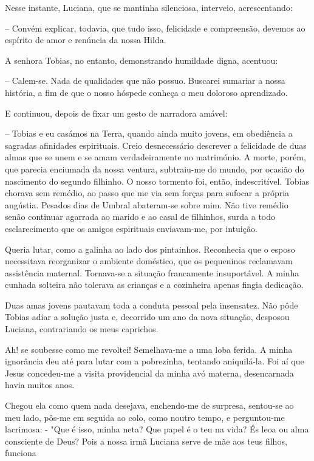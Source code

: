 \documentclass[portuguese,12pt,a4paper]{scrbook}
\begin{document}
	Nesse instante, Luciana, que se mantinha silenciosa, interveio, acrescentando:
	
	– Convém explicar, todavia, que tudo isso, felicidade e compreensão, devemos ao espírito de amor e renúncia da nossa Hilda.
	
	A senhora Tobias, no entanto, demonstrando humildade digna, acentuou:
	
	
	– Calem-se. Nada de qualidades que não possuo. Buscarei sumariar a nossa história, a fim de que o nosso hóspede conheça o meu doloroso aprendizado.
	
	E continuou, depois de fixar um gesto de narradora amável:
	
	– Tobias e eu casámos na Terra, quando ainda muito jovens, em obediência a sagradas afinidades espirituais. Creio desnecessário descrever a felicidade de duas almas que se unem e se amam verdadeiramente no matrimónio. A morte, porém, que parecia enciumada da nossa ventura, subtraiu-me do mundo, por ocasião do nascimento do segundo filhinho. O nosso tormento foi, então, indescritível. Tobias chorava sem remédio, ao passo que me via sem forças para sufocar a própria angústia. Pesados dias de Umbral abateram-se sobre mim. Não tive remédio senão continuar agarrada ao marido e ao casal de filhinhos, surda a todo esclarecimento que os amigos espirituais enviavam-me, por intuição.
	
	Queria lutar, como a galinha ao lado dos pintainhos. Reconhecia que o esposo necessitava reorganizar o ambiente doméstico, que os pequeninos reclamavam assistência maternal. Tornava-se a situação francamente insuportável. A minha cunhada solteira não tolerava as crianças e a cozinheira apenas fingia dedicação.
	
	Duas amas jovens pautavam toda a conduta pessoal pela insensatez. Não pôde Tobias adiar a solução justa e, decorrido um ano da nova situação, desposou Luciana, contrariando os meus caprichos.
	
	Ah! se soubesse como me revoltei! Semelhava-me a uma loba ferida. A minha ignorância deu até para lutar com a pobrezinha, tentando aniquilá-la. Foi aí que Jesus concedeu-me a visita providencial da minha avó materna, desencarnada havia muitos anos.
	
	Chegou ela como quem nada desejava, enchendo-me de surpresa, sentou-se ao meu lado, pôs-me em seguida ao colo, como noutro tempo, e perguntou-me lacrimosa: - "Que é isso, minha neta? Que papel é o teu na vida? És leoa ou alma consciente de Deus? Pois a nossa irmã Luciana serve de mãe aos teus filhos, funciona
	
\end{document}
